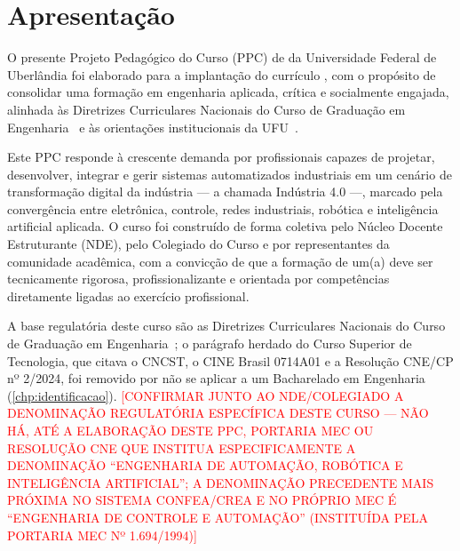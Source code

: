 \chapter{Apresentação}

O presente Projeto Pedagógico do Curso (PPC) de \ppccurso da Universidade Federal de Uberlândia foi elaborado para a implantação do currículo \ppcversao, com o propósito de consolidar uma formação em engenharia aplicada, crítica e socialmente engajada, alinhada às Diretrizes Curriculares Nacionais do Curso de Graduação em Engenharia~\cite{cne_ces_2_2019,cne_ces_1_2021} e às orientações institucionais da UFU~\cite{ufu_guia_ppc_2021}.

Este PPC responde à crescente demanda por profissionais capazes de projetar, desenvolver, integrar e gerir sistemas automatizados industriais em um cenário de transformação digital da indústria — a chamada Indústria 4.0 —, marcado pela convergência entre eletrônica, controle, redes industriais, robótica e inteligência artificial aplicada. O curso foi construído de forma coletiva pelo Núcleo Docente Estruturante (NDE), pelo Colegiado do Curso e por representantes da comunidade acadêmica, com a convicção de que a formação de um(a) \ppctitulacao deve ser tecnicamente rigorosa, profissionalizante e orientada por competências diretamente ligadas ao exercício profissional.

A base regulatória deste curso são as Diretrizes Curriculares Nacionais do Curso de Graduação em Engenharia~\cite{cne_ces_2_2019,cne_ces_1_2021}; o parágrafo herdado do Curso Superior de Tecnologia, que citava o CNCST, o CINE Brasil 0714A01 e a Resolução CNE/CP nº 2/2024, foi removido por não se aplicar a um Bacharelado em Engenharia (\autoref{chp:identificacao}). \textcolor{red}{[CONFIRMAR JUNTO AO NDE/COLEGIADO A DENOMINAÇÃO REGULATÓRIA ESPECÍFICA DESTE CURSO — NÃO HÁ, ATÉ A ELABORAÇÃO DESTE PPC, PORTARIA MEC OU RESOLUÇÃO CNE QUE INSTITUA ESPECIFICAMENTE A DENOMINAÇÃO ``ENGENHARIA DE AUTOMAÇÃO, ROBÓTICA E INTELIGÊNCIA ARTIFICIAL''; A DENOMINAÇÃO PRECEDENTE MAIS PRÓXIMA NO SISTEMA CONFEA/CREA E NO PRÓPRIO MEC É ``ENGENHARIA DE CONTROLE E AUTOMAÇÃO'' (INSTITUÍDA PELA PORTARIA MEC Nº 1.694/1994)]}

